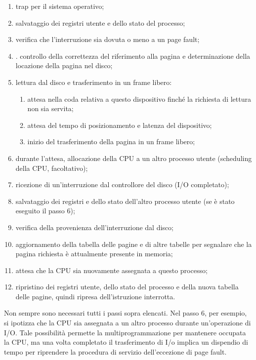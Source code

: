 \documentclass{article}
\begin{document}
				\begin{enumerate}
					\item trap per il sistema operativo;
					\item salvataggio dei registri utente e dello stato del processo;
					\item verifica che l’interruzione sia dovuta o meno a un page fault;
					\item . controllo della correttezza del riferimento alla pagina e determinazione della locazione della pagina nel disco;
					\item lettura dal disco e trasferimento in un frame libero:
					\begin{enumerate}
						\item attesa nella coda relativa a questo dispositivo finché la richiesta di lettura non sia servita;
						\item attesa del tempo di posizionamento e latenza del dispositivo;
						\item inizio del trasferimento della pagina in un frame libero;
					\end{enumerate}
					\item durante l’attesa, allocazione della CPU a un altro processo utente (scheduling della CPU, facoltativo);
					\item ricezione di un’interruzione dal controllore del disco (I/O completato);
					\item salvataggio dei registri e dello stato dell’altro processo utente (se è stato eseguito il passo 6);
					\item verifica della provenienza dell’interruzione dal disco;
					\item aggiornamento della tabella delle pagine e di altre tabelle per segnalare che la pagina richiesta è attualmente presente in memoria;
					\item attesa che la CPU sia nuovamente assegnata a questo processo;
					\item ripristino dei registri utente, dello stato del processo e della nuova tabella delle pagine, quindi ripresa dell’istruzione interrotta.
				\end{enumerate}
				Non sempre sono necessari tutti i passi sopra elencati. Nel passo 6, per esempio, si ipotizza che la CPU sia assegnata a un altro processo durante un’operazione di I/O. Tale possibilità permette la multiprogrammazione per mantenere occupata la CPU, ma una volta completato il trasferimento di I/o implica un dispendio di tempo per riprendere la procedura di servizio dell’eccezione di page fault.
\end{document}
